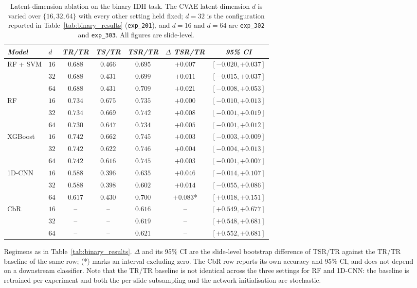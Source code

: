 \begin{table}[htp]
\centering
\small
\caption{Latent-dimension ablation on the binary IDH task. The CVAE latent dimension $d$ is
varied over $\{16, 32, 64\}$ with every other setting held fixed; $d=32$ is the
configuration reported in Table~\ref{tab:binary_results} (\texttt{exp\_201}), and $d=16$ and
$d=64$ are \texttt{exp\_302} and \texttt{exp\_303}. All figures are slide-level.}
\label{tab:latent_dim}
\begin{tabular*}{\textwidth}{@{\extracolsep{\fill}}llccccc}
\toprule
\emph{Model} & $d$ & \emph{TR/TR} & \emph{TS/TR} & \emph{TSR/TR} & \emph{$\Delta$ TSR/TR} & \emph{95\% CI}\\
\midrule
\multirow{3}{*}{RF + SVM} & $16$ & $0.688$ & $0.466$ & $0.695$ & $+0.007$ & $[-0.020, +0.037]$\\
  & $32$ & $0.688$ & $0.431$ & $0.699$ & $+0.011$ & $[-0.015, +0.037]$\\
  & $64$ & $0.688$ & $0.431$ & $0.709$ & $+0.021$ & $[-0.008, +0.053]$\\
\midrule
\multirow{3}{*}{RF} & $16$ & $0.734$ & $0.675$ & $0.735$ & $+0.000$ & $[-0.010, +0.013]$\\
  & $32$ & $0.734$ & $0.669$ & $0.742$ & $+0.008$ & $[-0.001, +0.019]$\\
  & $64$ & $0.730$ & $0.647$ & $0.734$ & $+0.005$ & $[-0.001, +0.012]$\\
\midrule
\multirow{3}{*}{XGBoost} & $16$ & $0.742$ & $0.662$ & $0.745$ & $+0.003$ & $[-0.003, +0.009]$\\
  & $32$ & $0.742$ & $0.622$ & $0.746$ & $+0.004$ & $[-0.004, +0.013]$\\
  & $64$ & $0.742$ & $0.616$ & $0.745$ & $+0.003$ & $[-0.001, +0.007]$\\
\midrule
\multirow{3}{*}{1D-CNN} & $16$ & $0.588$ & $0.396$ & $0.635$ & $+0.046$ & $[-0.014, +0.107]$\\
  & $32$ & $0.588$ & $0.398$ & $0.602$ & $+0.014$ & $[-0.055, +0.086]$\\
  & $64$ & $0.617$ & $0.430$ & $0.700$ & $+0.083$* & $[+0.018, +0.151]$\\
\midrule
\multirow{3}{*}{CbR} & $16$ & -- & -- & $0.616$ & -- & $[+0.549, +0.677]$\\
  & $32$ & -- & -- & $0.619$ & -- & $[+0.548, +0.681]$\\
  & $64$ & -- & -- & $0.621$ & -- & $[+0.552, +0.681]$\\
\bottomrule
\end{tabular*}
\small{Regimens as in Table~\ref{tab:binary_results}. $\Delta$ and its 95\% CI are the
slide-level bootstrap difference of TSR/TR against the TR/TR baseline of the same row;
(*) marks an interval excluding zero. The CbR row reports its own accuracy and 95\% CI, and
does not depend on a downstream classifier. Note that the TR/TR baseline is not identical
across the three settings for RF and 1D-CNN: the baseline is retrained per experiment and
both the per-slide subsampling and the network initialisation are stochastic.}
\end{table}

